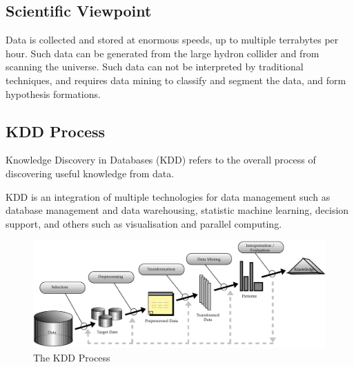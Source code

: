 \subsection{Scientific Viewpoint}
Data is collected and stored at enormous speeds, up to multiple terrabytes per hour.
Such data can be generated from the large hydron collider and from scanning the universe.
Such data can not be interpreted by traditional techniques, and requires data mining to classify and segment the data,
and form hypothesis formations.

\newpage
\subsection{KDD Process}
Knowledge Discovery in Databases (KDD) refers to the overall process of discovering useful knowledge from data.

KDD is an integration of multiple technologies for data management such as database management and data warehousing, 
statistic machine learning, decision support, and others such as visualisation and parallel computing. 

\begin{figure}[H]
    \centering
    \includegraphics[scale=0.2]{figures/kdd.png}
    \caption{The KDD Process}
\end{figure}

